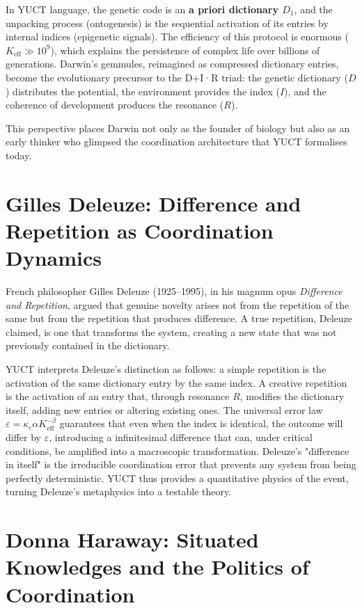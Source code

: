 \documentclass[12pt,a4paper]{article}
\begin{document}
	In YUCT language, the genetic code is an \textbf{a priori dictionary \(D_1\)}, and the unpacking process (ontogenesis) is the sequential activation of its entries by internal indices (epigenetic signals). The efficiency of this protocol is enormous (\(K_{\mathrm{eff}} \gg 10^9\)), which explains the persistence of complex life over billions of generations. Darwin's gemmules, reimagined as compressed dictionary entries, become the evolutionary precursor to the D+I·R triad: the genetic dictionary (\(D\)) distributes the potential, the environment provides the index (\(I\)), and the coherence of development produces the resonance (\(R\)).
	
	This perspective places Darwin not only as the founder of biology but also as an early thinker who glimpsed the coordination architecture that YUCT formalises today.
	
	\section{Gilles Deleuze: Difference and Repetition as Coordination Dynamics}
	
	French philosopher Gilles Deleuze (1925–1995), in his magnum opus \emph{Difference and Repetition}, argued that genuine novelty arises not from the repetition of the same but from the repetition that produces difference. A true repetition, Deleuze claimed, is one that transforms the system, creating a new state that was not previously contained in the dictionary.
	
	YUCT interprets Deleuze's distinction as follows: a simple repetition is the activation of the same dictionary entry by the same index. A creative repetition is the activation of an entry that, through resonance \(R\), modifies the dictionary itself, adding new entries or altering existing ones. The universal error law \(\varepsilon = \kappa_c \alpha K_{\mathrm{eff}}^{-\beta}\) guarantees that even when the index is identical, the outcome will differ by \(\varepsilon\), introducing a infinitesimal difference that can, under critical conditions, be amplified into a macroscopic transformation. Deleuze's "difference in itself" is the irreducible coordination error that prevents any system from being perfectly deterministic. YUCT thus provides a quantitative physics of the event, turning Deleuze's metaphysics into a testable theory.
	
	\section{Donna Haraway: Situated Knowledges and the Politics of Coordination}
	
\end{document}

